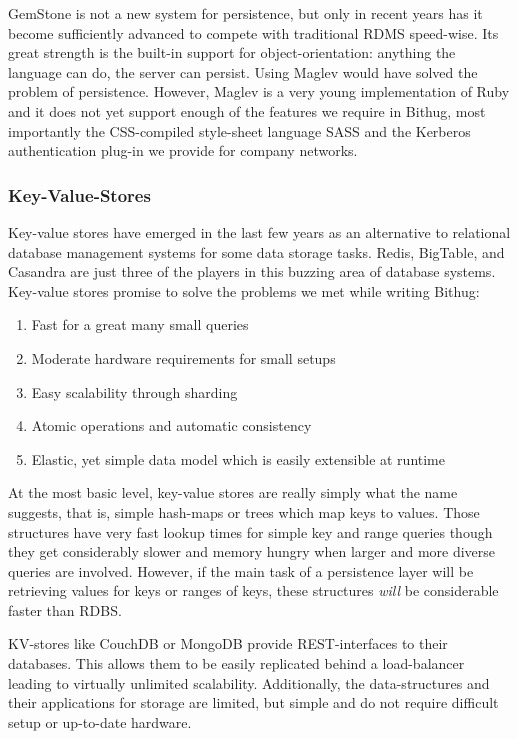 GemStone is not a new system\cite{butterworth1991gemstone} for persistence, but only
in recent years has it become sufficiently advanced to compete with traditional
RDMS speed-wise. Its great strength is the built-in support for 
object-orientation: anything the language can do, the server can persist. Using
Maglev would have solved the problem of persistence. However, Maglev is a very 
young implementation of Ruby and it does not yet support enough of the features
we require in Bithug, most importantly the CSS-compiled style-sheet language 
SASS and the Kerberos authentication plug-in we provide for company networks.
\subsubsection{Key-Value-Stores}
Key-value stores have emerged in the last few years as an alternative to 
relational database management systems for some data storage tasks. 
Redis, BigTable, and Casandra are just three of the players in this buzzing
area of database systems. Key-value stores promise to solve the problems we 
met while writing Bithug:
\begin{enumerate}
  \item Fast for a great many small queries
  \item Moderate hardware requirements for small setups
  \item Easy scalability through sharding
  \item Atomic operations and automatic consistency
  \item Elastic, yet simple data model which is easily extensible at runtime
\end{enumerate}

At the most basic level, key-value stores are really simply what the name 
suggests, that is, simple hash-maps or trees which map keys to values. Those 
structures have very fast lookup times for simple key and range queries though 
they get considerably slower and memory hungry when larger and more diverse 
queries are involved. However, if the main task of a persistence layer will be
retrieving values for keys or ranges of keys, these structures \emph{will} 
be\cite{chang2006bigtable} considerable faster than RDBS.

KV-stores like CouchDB or MongoDB provide REST-interfaces to their 
databases. This allows them to be easily replicated behind a load-balancer 
leading to virtually unlimited scalability. Additionally, the data-structures 
and their applications for storage are limited, but simple 
and do not require difficult setup or up-to-date hardware. 

